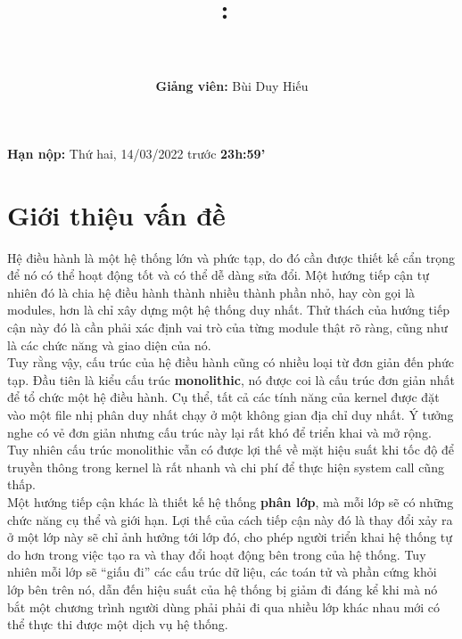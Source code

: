 \documentclass{article}
\title{
\vspace{-1in}
\textmd{\textbf{\hmwkClass:\ \hmwkTitle} \\ \hmwkAuthorName}\\ 
}
\author{\textbf{Giảng viên: } Bùi Duy Hiếu}
\date{}
\begin{document}
\maketitle
\vspace{-.4in}

\begin{center}
    \large{\textbf{Hạn nộp:} Thứ hai, 14/03/2022 trước \textbf{23h:59'}}
\end{center}

\section{Giới thiệu vấn đề}
Hệ điều hành là một hệ thống lớn và phức tạp, do đó cần được thiết kế cẩn trọng để nó có thể hoạt động tốt và có thể dễ dàng sửa đổi. Một hướng tiếp cận tự nhiên đó là chia hệ điều hành thành nhiều thành phần nhỏ, hay còn gọi là modules, hơn là chỉ xây dựng một hệ thống duy nhất. Thử thách của hướng tiếp cận này đó là cần phải xác định vai trò của từng module thật rõ ràng, cũng như là các chức năng và giao diện của nó.
\\

Tuy rằng vậy, cấu trúc của hệ điều hành cũng có nhiều loại từ đơn giản đến phức tạp. Đầu tiên là kiểu cấu trúc \textbf{monolithic}, nó được coi là cấu trúc đơn giản nhất để tổ chức một hệ điều hành. Cụ thể, tất cả các tính năng của kernel được đặt vào một file nhị phân duy nhất chạy ở một không gian địa chỉ duy nhất. Ý tưởng nghe có vẻ đơn giản nhưng cấu trúc này lại rất khó để triển khai và mở rộng. Tuy nhiên cấu trúc monolithic vẫn có được lợi thế về mặt hiệu suất khi tốc độ để truyền thông trong kernel là rất nhanh và chi phí để thực hiện system call cũng thấp.
\\

Một hướng tiếp cận khác là thiết kế hệ thống \textbf{phân lớp}, mà mỗi lớp sẽ có những chức năng cụ thể và giới hạn. Lợi thế của cách tiếp cận này đó là thay đổi xảy ra ở một lớp này sẽ chỉ ảnh hưởng tới lớp đó, cho phép người triển khai hệ thống tự do hơn trong việc tạo ra và thay đổi hoạt động bên trong của hệ thống. Tuy nhiên mỗi lớp sẽ “giấu đi” các cấu trúc dữ liệu, các toán tử và phần cứng khỏi lớp bên trên nó, dẫn đến hiệu suất của hệ thống bị giảm đi đáng kể khi mà nó bắt một chương trình người dùng phải phải đi qua nhiều lớp khác nhau mới có thể thực thi được một dịch vụ hệ thống.
\\
\end{document}
